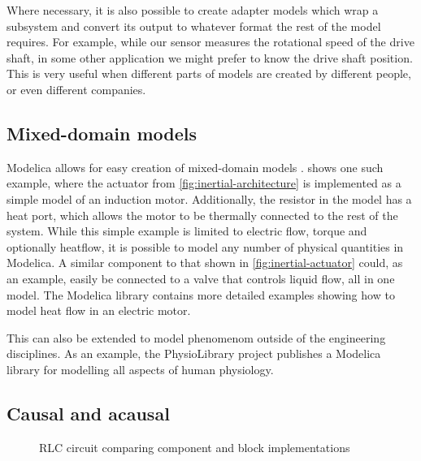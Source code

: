 \documentclass[\rootfolder/main.tex]{subfiles}
\begin{document}
Where necessary, it is also possible to create adapter models which wrap a subsystem and convert its output to whatever format the rest of the model requires.
For example, while our sensor measures the rotational speed of the drive shaft, in some other application we might prefer to know the drive shaft position.
This is very useful when different parts of models are created by different people, or even different companies.

\subsection{Mixed-domain models}

Modelica allows for easy creation of mixed-domain models \cite{clauss2002}.
 shows one such example, where the actuator from \cref{fig:inertial-architecture} is implemented as a simple model of an induction motor.
Additionally, the resistor in the model has a heat port, which allows the motor to be thermally connected to the rest of the system.
While this simple example is limited to electric flow, torque and optionally heatflow, it is possible to model any number of physical quantities in Modelica.
A similar component to that shown in \cref{fig:inertial-actuator} could, as an example, easily be connected to a valve that controls liquid flow, all in one model.
The Modelica library contains more detailed examples showing how to model heat flow in an electric motor\footnotemark.

This can also be extended to model phenomenom outside of the engineering disciplines.
As an example, the PhysioLibrary project publishes a Modelica library for modelling all aspects of human physiology.


\subsection{Causal and acausal}

\begin{figure}[ht]
    \centering
        {
            \def\svgwidth{0.37\columnwidth}\tiny
            
        }
        {
            \def\svgwidth{0.60\columnwidth}\tiny
            
        }
    \caption{RLC circuit comparing component and block implementations}
    \label{fig:rlc}
\end{figure}
\end{document}
